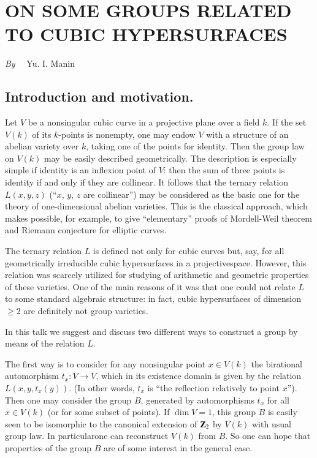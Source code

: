\chapter[\textsc{Yu. I. Manin~:} On Some Groups Related to Cubic Hyper-surfaces]{ON SOME GROUPS RELATED TO CUBIC HYPERSURFACES}\label{art13}

\begin{center}
{\em By}~~ Yu. I. Manin
\end{center}

\setcounter{pageoriginal}{254}
\section*{Introduction and motivation.}
\pageoriginale


Let $V$ be a nonsingular cubic curve in a projective plane over a field $k$. If the set $V(k)$ of its $k$-points is nonempty, one may endow $V$ with a structure of an abelian variety over $k$, taking one of the points for identity. Then the group law on $V(k)$ may be easily described geometrically. The description is especially simple if identity is an inflexion point of $V$: then the sum of three points is identity if and only if they are collinear. It follows that the ternary relation $L(x,y,z)$ (``$x$, $y$, $z$ are collinear'') may be considered as the basic one for the theory of one-dimensional abelian varieties. This is the classical approach, which makes possible, for example, to give ``elementary'' proofs of Mordell-Weil theorem and Riemann conjecture for elliptic curves.

The ternary relation $L$ is defined not only for cubic curves but, say, for all geometrically irreducible cubic hypersurfaces in a projective\break space. However, this relation was scarcely utilized for studying of arithmetic and geometric properties of these varieties. One of the main reasons of it was that one could not relate $L$ to some standard algebraic structure: in fact, cubic hypersurfaces of dimension $\geq 2$ are definitely not group varieties.

In this talk we suggest and discuss two different ways to construct a group by means of the relation $L$.

The first way is to consider for any nonsingular point $x\in V(k)$ the birational automorphism $t_{x}:V\to V$, which in its existence domain is given by the relation $L(x,y,t_{x}(y))$. (In other words, $t_{x}$ is ``the reflection relatively to point $x$''). Then one may consider the group $B$, generated by automorphisms $t_{x}$ for all $x\in V(k)$ (or for some subset of points). If $\dim V=1$, this group $B$ is easily seen to be isomorphic to the canonical extension of $\mathbf{Z}_{2}$ by $V(k)$ with usual group law. In particular\pageoriginale one can reconstruct $V(k)$ from $B$. So one can hope that properties of the group $B$ are of some interest in the general case.

